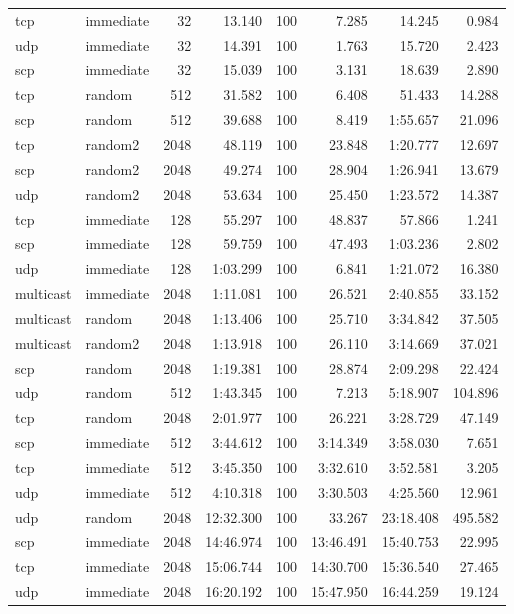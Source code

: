 \begin{tabular}{|llrrrrrr|}
tcp & immediate & 32 &  13.140 & 100 & 7.285 & 14.245 & 0.984\\
udp & immediate & 32 &  14.391 & 100 & 1.763 & 15.720 & 2.423\\
scp & immediate & 32 &  15.039 & 100 & 3.131 & 18.639 & 2.890\\
tcp & random & 512 &  31.582 & 100 & 6.408 & 51.433 & 14.288\\
scp & random & 512 &  39.688 & 100 & 8.419 & 1:55.657 & 21.096\\
tcp & random2 & 2048 &  48.119 & 100 & 23.848 & 1:20.777 & 12.697\\
scp & random2 & 2048 &  49.274 & 100 & 28.904 & 1:26.941 & 13.679\\
udp & random2 & 2048 &  53.634 & 100 & 25.450 & 1:23.572 & 14.387\\
tcp & immediate & 128 &  55.297 & 100 & 48.837 & 57.866 & 1.241\\
scp & immediate & 128 &  59.759 & 100 & 47.493 & 1:03.236 & 2.802\\
udp & immediate & 128 &  1:03.299 & 100 & 6.841 & 1:21.072 & 16.380\\
multicast & immediate & 2048 &  1:11.081 & 100 & 26.521 & 2:40.855 & 33.152\\
multicast & random & 2048 &  1:13.406 & 100 & 25.710 & 3:34.842 & 37.505\\
multicast & random2 & 2048 &  1:13.918 & 100 & 26.110 & 3:14.669 & 37.021\\
scp & random & 2048 &  1:19.381 & 100 & 28.874 & 2:09.298 & 22.424\\
udp & random & 512 &  1:43.345 & 100 & 7.213 & 5:18.907 & 104.896\\
tcp & random & 2048 &  2:01.977 & 100 & 26.221 & 3:28.729 & 47.149\\
scp & immediate & 512 &  3:44.612 & 100 & 3:14.349 & 3:58.030 & 7.651\\
tcp & immediate & 512 &  3:45.350 & 100 & 3:32.610 & 3:52.581 & 3.205\\
udp & immediate & 512 &  4:10.318 & 100 & 3:30.503 & 4:25.560 & 12.961\\
udp & random & 2048 &  12:32.300 & 100 & 33.267 & 23:18.408 & 495.582\\
scp & immediate & 2048 &  14:46.974 & 100 & 13:46.491 & 15:40.753 & 22.995\\
tcp & immediate & 2048 &  15:06.744 & 100 & 14:30.700 & 15:36.540 & 27.465\\
udp & immediate & 2048 &  16:20.192 & 100 & 15:47.950 & 16:44.259 & 19.124\\
\hline
\end{tabular}

